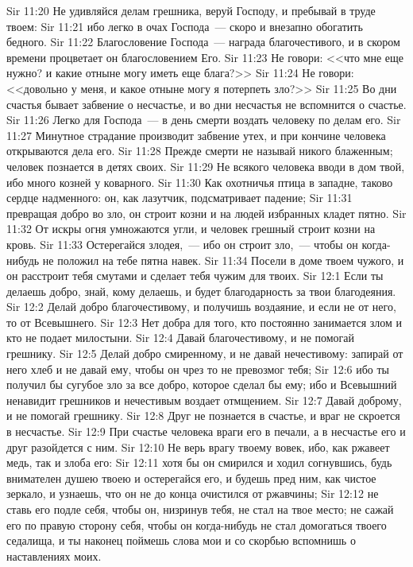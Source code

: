 \vs Sir 11:20 Не удивляйся делам грешника, веруй Господу, и пребывай в труде твоем:
\vs Sir 11:21 ибо легко в очах Господа~--- скоро и внезапно обогатить бедного.
\vs Sir 11:22 Благословение Господа~--- награда благочестивого, и в скором времени процветает он благословением Его.
\vs Sir 11:23 Не говори: <<что мне еще нужно? и какие отныне могу иметь еще блага?>>
\vs Sir 11:24 Не говори: <<довольно у меня, и какое отныне могу я потерпеть зло?>>
\vs Sir 11:25 Во дни счастья бывает забвение о несчастье, и во дни несчастья не вспомнится о счастье.
\vs Sir 11:26 Легко для Господа~--- в день смерти воздать человеку по делам его.
\vs Sir 11:27 Минутное страдание производит забвение утех, и при кончине человека открываются дела его.
\vs Sir 11:28 Прежде смерти не называй никого блаженным; человек познается в детях своих.
\rsbpar\vs Sir 11:29 Не всякого человека вводи в дом твой, ибо много козней у коварного.
\vs Sir 11:30 Как охотничья птица в западне, таково сердце надменного: он, как лазутчик, подсматривает падение;
\vs Sir 11:31 превращая добро во зло, он строит козни и на людей избранных кладет пятно.
\vs Sir 11:32 От искры огня умножаются угли, и человек грешный строит козни на кровь.
\vs Sir 11:33 Остерегайся злодея,~--- ибо он строит зло,~--- чтобы он когда-нибудь не положил на тебе пятна навек.
\vs Sir 11:34 Посели в доме твоем чужого, и он расстроит тебя смутами и сделает тебя чужим для твоих.
\vs Sir 12:1 Если ты делаешь добро, знай, кому делаешь, и будет благодарность за твои благодеяния.
\vs Sir 12:2 Делай добро благочестивому, и получишь воздаяние, и если не от него, то от Всевышнего.
\vs Sir 12:3 Нет добра для того, кто постоянно занимается злом и кто не подает милостыни.
\vs Sir 12:4 Давай благочестивому, и не помогай грешнику.
\vs Sir 12:5 Делай добро смиренному, и не давай нечестивому: запирай от него хлеб и не давай ему, чтобы он чрез то не превозмог тебя;
\vs Sir 12:6 ибо ты получил бы сугубое зло за все добро, которое сделал бы ему; ибо и Всевышний ненавидит грешников и нечестивым воздает отмщением.
\vs Sir 12:7 Давай доброму, и не помогай грешнику.
\vs Sir 12:8 Друг не познается в счастье, и враг не скроется в несчастье.
\vs Sir 12:9 При счастье человека враги его в печали, а в несчастье его и друг разойдется с ним.
\vs Sir 12:10 Не верь врагу твоему вовек, ибо, как ржавеет медь, так и злоба его:
\vs Sir 12:11 хотя бы он смирился и ходил согнувшись, будь внимателен душею твоею и остерегайся его, и будешь пред ним, как чистое зеркало, и узнаешь, что он не до конца очистился от ржавчины;
\vs Sir 12:12 не ставь его подле себя, чтобы он, низринув тебя, не стал на твое место; не сажай его по правую сторону себя, чтобы он когда-нибудь не стал домогаться твоего седалища, и ты наконец поймешь слова мои и со скорбью вспомнишь о наставлениях моих.

